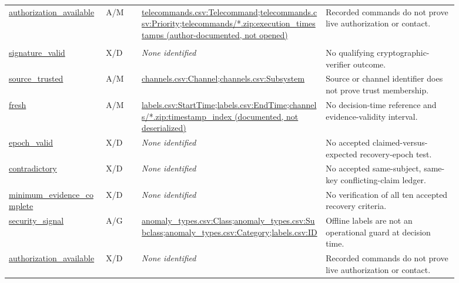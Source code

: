 \begin{longtable}{@{}>{\raggedright\arraybackslash}p{0.19\linewidth}>{\raggedright\arraybackslash}p{0.075\linewidth}>{\raggedright\arraybackslash}p{0.365\linewidth}>{\raggedright\arraybackslash}p{0.26\linewidth}@{}}
\url{authorization_available} & A/M & \url{telecommands.csv:Telecommand};\allowbreak \url{telecommands.csv:Priority};\allowbreak \url{telecommands/*.zip:execution_timestamps (author-documented, not opened)} & Recorded commands do not prove live authorization or contact. \\
\addlinespace[3pt]
\multicolumn{4}{@{}l}{\textbf{ESA v2 Mission 3}}\\
\url{signature_valid} & X/D & \emph{None identified} & No qualifying cryptographic-verifier outcome. \\
\url{source_trusted} & A/M & \url{channels.csv:Channel};\allowbreak \url{channels.csv:Subsystem} & Source or channel identifier does not prove trust membership. \\
\url{fresh} & A/M & \url{labels.csv:StartTime};\allowbreak \url{labels.csv:EndTime};\allowbreak \url{channels/*.zip:timestamp_index (documented, not deserialized)} & No decision-time reference and evidence-validity interval. \\
\url{epoch_valid} & X/D & \emph{None identified} & No accepted claimed-versus-expected recovery-epoch test. \\
\url{contradictory} & X/D & \emph{None identified} & No accepted same-subject, same-key conflicting-claim ledger. \\
\url{minimum_evidence_complete} & X/D & \emph{None identified} & No verification of all ten accepted recovery criteria. \\
\url{security_signal} & A/G & \url{anomaly_types.csv:Class};\allowbreak \url{anomaly_types.csv:Subclass};\allowbreak \url{anomaly_types.csv:Category};\allowbreak \url{labels.csv:ID} & Offline labels are not an operational guard at decision time. \\
\url{authorization_available} & X/D & \emph{None identified} & Recorded commands do not prove live authorization or contact. \\

\end{longtable}

